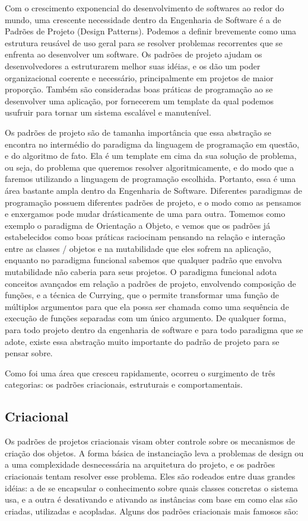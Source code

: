 Com o crescimento exponencial do desenvolvimento de softwares ao redor do mundo, uma crescente necessidade dentro da Engenharia de Software é a de Padrões de Projeto (Design Patterns). Podemos a definir brevemente como uma estrutura reusável de uso geral para se resolver problemas recorrentes que se enfrenta ao desenvolver um software. Os padrões de projeto ajudam os desenvolvedores a estruturarem melhor suas idéias, e os dão um poder organizacional coerente e necessário, principalmente em projetos de maior proporção. Também são consideradas boas práticas de programação ao se desenvolver uma aplicação, por fornecerem um template da qual podemos usufruir para tornar um sistema escalável e manutenível.

Os padrões de projeto são de tamanha importância que essa abstração se encontra no intermédio do paradigma da linguagem de programação em questão, e do algoritmo de fato. Ela é um template em cima da sua solução de problema, ou seja, do problema que queremos resolver algoritmicamente, e do modo que a faremos utilizando a linguagem de programação escolhida. Portanto, essa é uma área bastante ampla dentro da Engenharia de Software. Diferentes paradigmas de programação possuem diferentes padrões de projeto, e o modo como as pensamos e enxergamos pode mudar drásticamente de uma para outra. Tomemos como exemplo o paradigma de Orientação a Objeto, e vemos que os padrões já estabelecidos como boas práticas raciocinam pensando na relação e interação entre as classes / objetos e na mutabilidade que eles sofrem na aplicação, enquanto no paradigma funcional sabemos que qualquer padrão que envolva mutabilidade não caberia para seus projetos. O paradigma funcional adota conceitos avançados em relação a padrões de projeto, envolvendo composição de funções, e a técnica de Currying, que o permite transformar uma função de múltiplos argumentos para que ela possa ser chamada como uma sequência de execução de funções separadas com um único argumento. De qualquer forma, para todo projeto dentro da engenharia de software e para todo paradigma que se adote, existe essa abstração muito importante do padrão de projeto para se pensar sobre.

Como foi uma área que cresceu rapidamente, ocorreu o surgimento de três categorias: os padrões criacionais, estruturais e comportamentais.

\subsection{Criacional}
Os padrões de projetos criacionais visam obter controle sobre os mecanismos de criação dos objetos. A forma básica de instanciação leva a problemas de design ou a uma complexidade desnecessária na arquitetura do projeto, e os padrões criacionais tentam resolver esse problema. Eles são rodeados entre duas grandes idéias: a de se encapsular o conhecimento sobre quais classes concretas o sistema usa, e a outra é desativando e ativando as instâncias com base em como elas são criadas, utilizadas e acopladas. Alguns dos padrões criacionais mais famosos são:


